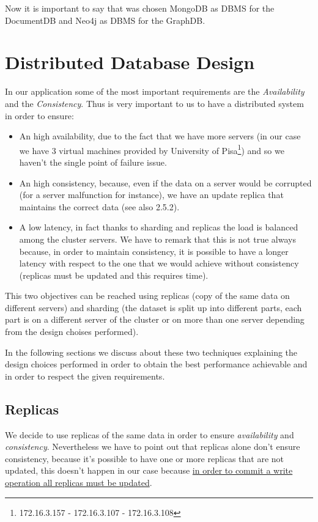 \documentclass[a4paper]{report}
\begin{document}
\noindent Now it is important to say that was chosen MongoDB as DBMS for the DocumentDB and Neo4j as DBMS for the GraphDB.


\section{Distributed Database Design}
In our application some of the most important requirements are the \emph{Availability} and the \emph{Consistency}. Thus is very important to us to have a distributed system in order to ensure:
\begin{itemize}
	\item An high availability, due to the fact that we have more servers (in our case we have 3 virtual machines provided by University of Pisa\footnote{172.16.3.157 - 172.16.3.107 -  172.16.3.108}) and so we haven't the single point of failure issue.
	\item An high consistency, because, even if the data on a server would be corrupted (for a server malfunction for instance), we have an update replica that maintains the correct data (see also 2.5.2).
	\item A low latency, in fact thanks to sharding and replicas the load is balanced among the cluster servers. We have to remark that this is not true always because, in order to maintain consistency, it is possible to have a longer latency with respect to the one that we would achieve without consistency (replicas must be updated and this requires time).
\end{itemize}

\noindent This two objectives can be reached using replicas (copy of the same data on different servers) and sharding (the dataset is split up into different parts, each part is on a different server of the cluster or on more than one server depending from the design choises performed).

\noindent In the following sections we discuss about these two techniques explaining the design choices performed in order to obtain the best performance achievable and in order to respect the given requirements. 



\subsection{Replicas}
We decide to use replicas of the same data in order to ensure \emph{availability} and \emph{consistency}. Nevertheless we have to point out that replicas alone don't ensure consistency, because it's possible to have one or more replicas that are not updated, this doesn't happen in our case because \underline{in order to commit a write operation all replicas must be updated}.
\end{document}
